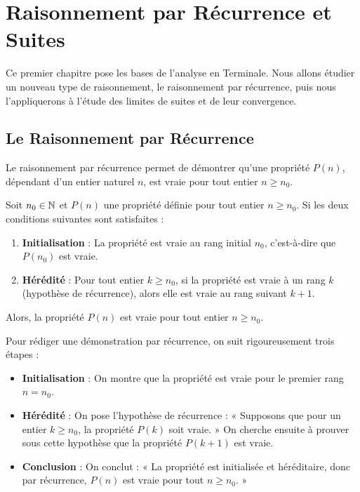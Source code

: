 \chapter{Raisonnement par Récurrence et Suites}

Ce premier chapitre pose les bases de l'analyse en Terminale. Nous allons étudier un nouveau type de raisonnement, le raisonnement par récurrence, puis nous l'appliquerons à l'étude des limites de suites et de leur convergence.

\section{Le Raisonnement par Récurrence}

Le raisonnement par récurrence permet de démontrer qu'une propriété $P(n)$, dépendant d'un entier naturel $n$, est vraie pour tout entier $n \ge n_0$.

\begin{definition}
Soit $n_0 \in \mathbb{N}$ et $P(n)$ une propriété définie pour tout entier $n \ge n_0$.
Si les deux conditions suivantes sont satisfaites :
\begin{enumerate}
    \item \textbf{Initialisation} : La propriété est vraie au rang initial $n_0$, c'est-à-dire que $P(n_0)$ est vraie.
    \item \textbf{Hérédité} : Pour tout entier $k \ge n_0$, si la propriété est vraie à un rang $k$ (hypothèse de récurrence), alors elle est vraie au rang suivant $k+1$.
\end{enumerate}
Alors, la propriété $P(n)$ est vraie pour tout entier $n \ge n_0$.
\end{definition}

\begin{methode}
Pour rédiger une démonstration par récurrence, on suit rigoureusement trois étapes :
\begin{itemize}
    \item \textbf{Initialisation} : On montre que la propriété est vraie pour le premier rang $n = n_0$.
    \item \textbf{Hérédité} : On pose l'hypothèse de récurrence : « Supposons que pour un entier $k \ge n_0$, la propriété $P(k)$ soit vraie. » On cherche ensuite à prouver sous cette hypothèse que la propriété $P(k+1)$ est vraie.
    \item \textbf{Conclusion} : On conclut : « La propriété est initialisée et héréditaire, donc par récurrence, $P(n)$ est vraie pour tout $n \ge n_0$. »
\end{itemize}
\end{methode}

